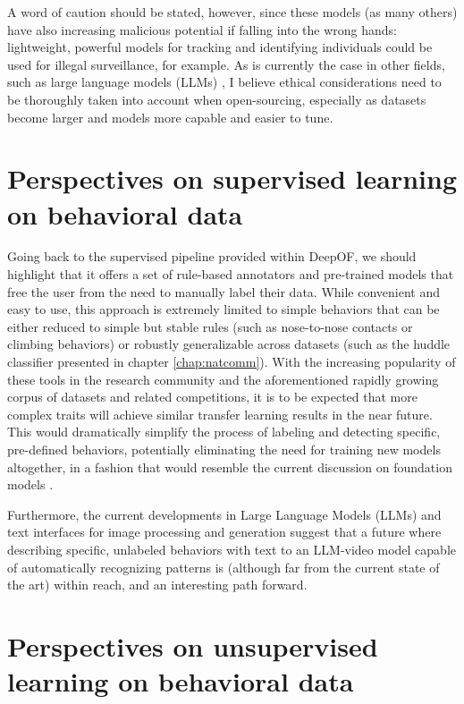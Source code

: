 A word of caution should be stated, however, since these models (as many others) have also increasing malicious potential if falling into the wrong hands: lightweight, powerful models for tracking and identifying individuals could be used for illegal surveillance, for example. As is currently the case in other fields, such as large language models (LLMs) \cite{Weidinger2021EthicalModels, Weidinger2022TaxonomyModels}, I believe ethical considerations need to be thoroughly taken into account when open-sourcing, especially as datasets become larger and models more capable and easier to tune.

\section{Perspectives on supervised learning on behavioral data}

Going back to the supervised pipeline provided within DeepOF, we should highlight that it offers a set of rule-based annotators and pre-trained models that free the user from the need to manually label their data. While convenient and easy to use, this approach is extremely limited to simple behaviors that can be either reduced to simple but stable rules (such as nose-to-nose contacts or climbing behaviors) or robustly generalizable across datasets (such as the huddle classifier presented in chapter \ref{chap:natcomm}).
With the increasing popularity of these tools in the research community and the aforementioned rapidly growing corpus of datasets and related competitions, it is to be expected that more complex traits will achieve similar transfer learning results in the near future. This would dramatically simplify the process of labeling and detecting specific, pre-defined behaviors, potentially eliminating the need for training new models altogether, in a fashion that would resemble the current discussion on foundation models \cite{Bommasani2021OnModels}. 

Furthermore, the current developments in Large Language Models (LLMs) and text interfaces for image processing and generation \cite{OpenAI2023GPT-4Report, Ramesh2022HierarchicalLatents} suggest that a future where describing specific, unlabeled behaviors with text to an LLM-video model capable of automatically recognizing patterns is (although far from the current state of the art) within reach, and an interesting path forward.

\section{Perspectives on unsupervised learning on behavioral data}

